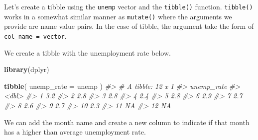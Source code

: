 \documentclass[
]{book}
\newenvironment{Shaded}{\begin{snugshade}}{\end{snugshade}}
\newcommand{\CommentTok}[1]{\textcolor[rgb]{0.56,0.35,0.01}{\textit{#1}}}
\newcommand{\DataTypeTok}[1]{\textcolor[rgb]{0.13,0.29,0.53}{#1}}
\newcommand{\KeywordTok}[1]{\textcolor[rgb]{0.13,0.29,0.53}{\textbf{#1}}}
\newcommand{\NormalTok}[1]{#1}
\begin{document}
Let's create a tibble using the \texttt{unemp} vector and the \texttt{tibble()} function. \texttt{tibble()} works in a somewhat similar manner as \texttt{mutate()} where the arguments we provide are name value pairs. In the case of tibble, the argument take the form of \texttt{col\_name\ =\ vector}.

We create a tibble with the unemployment rate below.

\begin{Shaded}
\begin{Highlighting}[]
\KeywordTok{library}\NormalTok{(dplyr)}

\KeywordTok{tibble}\NormalTok{(}
  \DataTypeTok{unemp\_rate =}\NormalTok{ unemp}
\NormalTok{)}
\CommentTok{\#\textgreater{} \# A tibble: 12 x 1}
\CommentTok{\#\textgreater{}    unemp\_rate}
\CommentTok{\#\textgreater{}         \textless{}dbl\textgreater{}}
\CommentTok{\#\textgreater{}  1        3.2}
\CommentTok{\#\textgreater{}  2        2.8}
\CommentTok{\#\textgreater{}  3        2.8}
\CommentTok{\#\textgreater{}  4        2.4}
\CommentTok{\#\textgreater{}  5        2.8}
\CommentTok{\#\textgreater{}  6        2.9}
\CommentTok{\#\textgreater{}  7        2.7}
\CommentTok{\#\textgreater{}  8        2.6}
\CommentTok{\#\textgreater{}  9        2.7}
\CommentTok{\#\textgreater{} 10        2.3}
\CommentTok{\#\textgreater{} 11       NA  }
\CommentTok{\#\textgreater{} 12       NA}
\end{Highlighting}
\end{Shaded}

We can add the month name and create a new column to indicate if that month has a higher than average unemployment rate.
\end{document}
